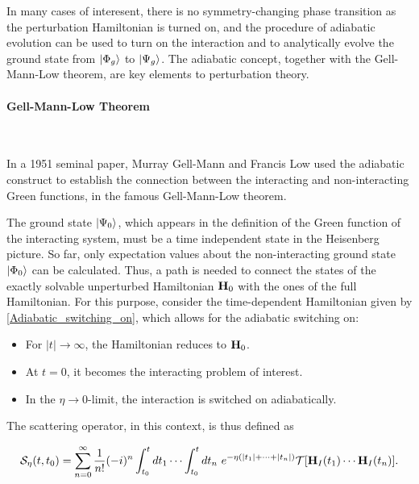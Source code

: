 In many cases of interesent, there is no symmetry-changing phase transition as the perturbation Hamiltonian is turned on, and the procedure of adiabatic evolution can be used to turn on the interaction and to analytically evolve the ground state from $\ket{\Phi_g}$ to $\ket{\Psi_g}$. The adiabatic concept, together with the Gell-Mann-Low theorem, are key elements to perturbation theory. \\

\paragraph{Gell-Mann-Low Theorem}

\blanky \\

\begin{tcolorbox}[colback = LimeGreen, title = Historical Context]

In a 1951 seminal paper, Murray Gell-Mann and Francis Low used the adiabatic construct to establish the connection between the interacting and non-interacting Green functions, in the famous Gell-Mann-Low theorem. 

\end{tcolorbox}

The ground state $\ket{\Psi_0}$, which appears in the definition of the Green function of the interacting system, must be a time independent state in the Heisenberg picture. So far, only expectation values about the non-interacting ground state $\ket{\Phi_0}$ can be calculated. Thus, a path is needed to connect the states of the exactly solvable unperturbed Hamiltonian ${\bf H}_0$ with the ones of the full Hamiltonian. For this purpose, consider the time-dependent Hamiltonian given by \cref{Adiabatic_switching_on}, which allows for the adiabatic switching on:

\begin{itemize}
    \item For $|t|\rightarrow \infty$, the Hamiltonian reduces to ${\bf H}_0$. 
    \item At $t=0$, it becomes the interacting problem of interest.
    \item In the $\eta \rightarrow 0$-limit, the interaction is switched on adiabatically.
\end{itemize}

The scattering operator, in this context, is thus defined as 

\begin{equation}
    \mathcal{S}_{\eta}(t, t_0) = \sum_{n = 0}^{\infty} \frac{1}{n!} (-i)^{n} \int_{t_0}^{t} dt_1 \cdots \int_{t_0}^{t} dt_n \textnormal{ } e^{-\eta (|t_1| + \cdots + |t_n|)} \mathcal{T} [{\bf H}_{I}(t_1) \cdots {\bf H}_{I}(t_n)].
\end{equation}

